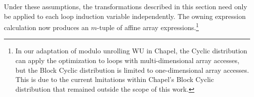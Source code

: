 Under these assumptions, the transformations described in this section need only be applied to each loop induction variable independently. The owning expression calculation now produces an $m$-tuple of affine array expressions.\footnote{In our adaptation of modulo unrolling WU in Chapel, the Cyclic distribution can apply the optimization to loops with multi-dimensional array accesses, but the Block Cyclic distribution is limited to one-dimensional array accesses. This is due to the current lmitations within Chapel's Block Cyclic distribution that remained outside the scope of this work. }

 

